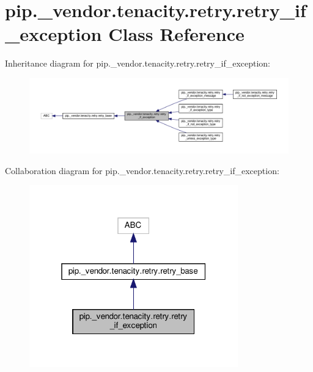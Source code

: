 \hypertarget{classpip_1_1__vendor_1_1tenacity_1_1retry_1_1retry__if__exception}{}\section{pip.\+\_\+vendor.\+tenacity.\+retry.\+retry\+\_\+if\+\_\+exception Class Reference}
\label{classpip_1_1__vendor_1_1tenacity_1_1retry_1_1retry__if__exception}


Inheritance diagram for pip.\+\_\+vendor.\+tenacity.\+retry.\+retry\+\_\+if\+\_\+exception\+:
\nopagebreak
\begin{figure}[H]
\begin{center}
\leavevmode
\includegraphics[width=350pt]{classpip_1_1__vendor_1_1tenacity_1_1retry_1_1retry__if__exception__inherit__graph}
\end{center}
\end{figure}


Collaboration diagram for pip.\+\_\+vendor.\+tenacity.\+retry.\+retry\+\_\+if\+\_\+exception\+:
\nopagebreak
\begin{figure}[H]
\begin{center}
\leavevmode
\includegraphics[width=256pt]{classpip_1_1__vendor_1_1tenacity_1_1retry_1_1retry__if__exception__coll__graph}
\end{center}
\end{figure}
